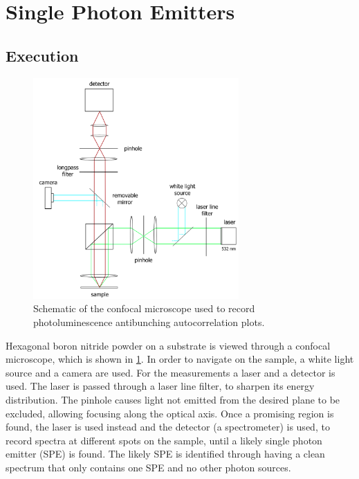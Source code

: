 \section{Single Photon Emitters}
\label{sec:SPE}

\subsection{Execution}

\begin{figure}[!ht]
    \centering
    \includegraphics[width=0.7\textwidth]{img/setup2.png}
    \caption{Schematic of the confocal microscope used to record photoluminescence antibunching autocorrelation plots.}
    \label{fig_confocal}
\end{figure}

Hexagonal boron nitride powder on a substrate is viewed through a confocal microscope, which is shown in \cref{fig_confocal}.
In order to navigate on the sample, a white light source and a camera are used.
For the measurements a laser and a detector is used.
The laser is passed through a laser line filter, to sharpen its energy distribution.
The pinhole causes light not emitted from the desired plane to be excluded, allowing focusing along the optical axis.
Once a promising region is found, the laser is used instead and the detector (a spectrometer) is used, to record spectra at different spots on the sample, until a likely single photon emitter (SPE) is found.
The likely SPE is identified through having a clean spectrum that only contains one SPE and no other photon sources.%

